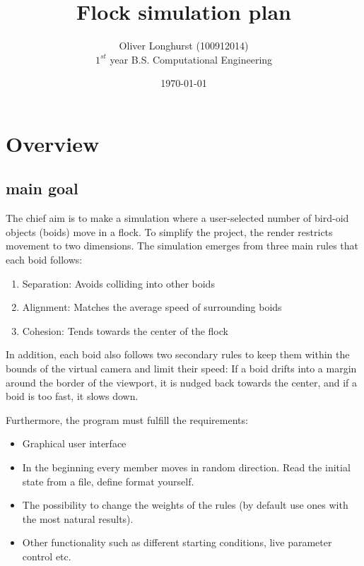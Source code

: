 \documentclass{article}
\title{Flock simulation plan}
\date{\today}
\author{Oliver Longhurst (100912014)
\\ $1^{st}$ year B.S. Computational Engineering}
\begin{document}
\maketitle
\section{Overview}
\subsection{main goal}
The chief aim is to make a simulation where a user-selected number of bird-oid objects (boids) move in a flock. To simplify the project, the render restricts movement to two dimensions.
\vspace{2ex}
The simulation emerges from three main rules that each boid follows:

\begin{center}
    \begin{enumerate}
    \item Separation: Avoids colliding into other boids
    \item Alignment: Matches the average speed of surrounding boids 
    \item Cohesion: Tends towards the center of the flock
\end{enumerate}
\end{center}

In addition, each boid also follows two secondary rules to keep them within the bounds of the virtual camera and limit their speed: If a boid drifts into a margin around the border of the viewport, it is nudged back towards the center, and if a boid is too fast, it slows down.

\vspace{2ex}
Furthermore, the program must fulfill the requirements:

\begin{itemize}

    \item Graphical user interface

    \item In the beginning every member moves in random direction. Read the initial state from a file, define format yourself.

    \item The possibility to change the weights of the rules (by default use ones with the most natural results).

    \item Other functionality such as different starting conditions, live parameter control etc.

\end{itemize}
\end{document}
